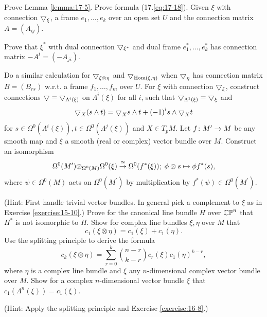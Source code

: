 \begin{enumerate}[label=\theexercise.\arabic*.,ref=\theexercise.\arabic*,leftmargin=2.7em]
  \NewItem Prove Lemma \ref{lemma:17-5}.
  \NewItem Prove formula (17.\ref{eq:17-18}).
  \NewItem Given $\xi$ with connection ${\bigtriangledown }_{\xi }$, a frame ${e}_{1},\ldots,{e}_{k}$ over an open set $U$ and the connection matrix $A = ( {A}_{ij})$.\par
    Prove that ${\xi }^*$ with dual connection $\bigtriangledown_{\xi^*}$ and dual frame ${e}_{1}^*,\ldots,{e}_{k}^*$ has connection matrix $- {A}^{t} = ( {-{A}_{ji}})$.\par
    Do a similar calculation for ${\bigtriangledown }_{\xi  \otimes  \eta }$ and ${\bigtriangledown }_{\mathrm{Hom}( {\xi,\eta }) }$ when ${\bigtriangledown }_{\eta }$ has connection matrix $B = ( {B}_{rs})$ w.r.t. a frame ${f}_{1},\ldots,{f}_{m}$ over $U$.
  \NewItem For $\xi$ with connection ${\bigtriangledown }_{\xi }$, construct connections $\bigtriangledown  = {\bigtriangledown }_{{\Lambda }^{i}( \xi ) }$ on ${\Lambda }^{i}( \xi )$ for all $i$, such that ${\bigtriangledown }_{{\Lambda }^{1}( \xi ) } = {\bigtriangledown }_{\xi }$ and
    \[
      {\bigtriangledown }_{X}( {s \land  t})  = {\bigtriangledown }_{X}s \land  t + {(-1) }^{i}s \land  {\bigtriangledown}_{X}t
    \]
    for $s \in  {\Omega }^{0}( {{\Lambda }^{i}( \xi ) }),t \in  {\Omega }^{0}( {{\Lambda }^{j}( \xi ) })$ and $X \in  {T}_{p}M$.
  \NewItem Let $f\colon {M}^{\prime } \rightarrow  M$ be any smooth map and $\xi$ a smooth (real or complex) vector bundle over $M$. Construct an isomorphism
    \[
      {\Omega }^{0}( {M}^{\prime }) { \otimes  }_{{\Omega }^{0}( M) }{\Omega }^{0}( \xi ) \overset{ \cong  }{ \rightarrow  }{\Omega }^{0}( {{f}^*( \xi ) });\;\phi  \otimes  s \mapsto  \phi {f}^*( s),
    \]
    where $\psi  \in  {\Omega }^{0}( M)$ acts on ${\Omega }^{0}( {M}^{\prime })$ by multiplication by ${f}^*( \psi )  \in  {\Omega }^{0}( {M}^{\prime })$. \par(Hint: First handle trivial vector bundles. In general pick a complement to $\xi$ as in Exercise \ref{exercise:15-10}.)
  \newchap[18]
  \NewItem Prove for the canonical line bundle $H$ over ${\mathbb{{CP}}}^{n}$ that ${H}^*$ is not isomorphic to $H$.
  \NewItem Show for complex line bundles $\xi,\eta$ over $M$ that
    \[
      {c}_{1}( {\xi  \otimes  \eta })  = {c}_{1}( \xi )  + {c}_{1}( \eta ).
    \]
    Use the splitting principle to derive the formula
    \[
      {c}_{k}( {\xi  \otimes  \eta })  = \sum_{{r = 0}}^{k}\binom{n-r}{k-r}{c}_{r}( \xi ) {c}_{1}{( \eta ) }^{k- r},
    \]
    where $\eta$ is a complex line bundle and $\xi$ any $n$-dimensional complex vector bundle over $M$.
  \NewItem Show for a complex $n$-dimensional vector bundle $\xi$ that ${c}_{1}( {{\Lambda }^{n}( \xi ) })  = {c}_{1}( \xi )$. \par(Hint: Apply the splitting principle and Exercise \ref{exercise:16-8}.)

\end{enumerate}
